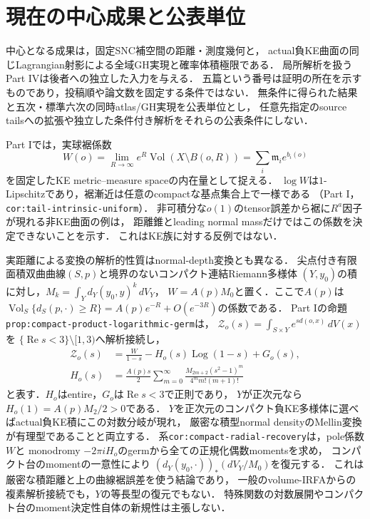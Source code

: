 \documentclass[a4paper,11pt]{ltjsarticle}
\numberwithin{equation}{section}
\theoremstyle{plain}
\theoremstyle{definition}
\theoremstyle{remark}
\newcommand{\Vol}{\operatorname{Vol}}
\begin{document}
\section{現在の中心成果と公表単位}

中心となる成果は，固定SNC補空間の距離・測度幾何と，
actual負KE曲面の同じLagrangian射影による全域GH実現と確率体積極限である．
局所解析を扱うPart IVは後者への独立した入力を与える．
五篇という番号は証明の所在を示すものであり，投稿順や論文数を固定する条件ではない．
無条件に得られた結果と五次・標準六次の同時atlas/GH実現を公表単位とし，
任意先指定のsource tailsへの拡張や独立した条件付き解析をそれらの公表条件にしない．

Part Iでは，実球裾係数
\[
 W(o)=\lim_{R\to\infty}e^R\Vol(X\setminus B(o,R))
     =\sum_i\mathfrak m_i e^{b_i(o)}
\]
を固定したKE metric--measure spaceの内在量として捉える．
$\log W$は$1$-Lipschitzであり，裾漸近は任意のcompactな基点集合上で一様である
（Part I，\texttt{cor:tail-intrinsic-uniform}）．
非可積分な$o(1)$のtensor誤差から裾に$R^a$因子が現れる非KE曲面の例は，
距離錐とleading normal massだけではこの係数を決定できないことを示す．
これはKE族に対する反例ではない．

実距離による変換の解析的性質はnormal-depth変換とも異なる．
尖点付き有限面積双曲曲線\((S,p)\)と境界のないコンパクト連結Riemann多様体
\((Y,y_0)\)の積に対し，\(M_k=\int_Yd_Y(y_0,y)^k\,dV_Y\)，
\(W=A(p)M_0\)と置く．ここで\(A(p)\)は
\(\Vol_S\{d_S(p,\cdot)\ge R\}=A(p)e^{-R}+O(e^{-3R})\)の係数である．
Part Iの命題\texttt{prop:compact-product-logarithmic-germ}は，
\(\mathcal Z_o(s)=\int_{S\times Y}e^{s d(o,x)}\,dV(x)\)を
\(\{\operatorname{Re}s<3\}\setminus[1,3)\)へ解析接続し，
\begin{align}
 \mathcal Z_o(s)&=\frac{W}{1-s}-H_o(s)\operatorname{Log}(1-s)+G_o(s),
 \label{eq:product-distance-log-germ}\\
 H_o(s)&=\frac{A(p)s}{2}\sum_{m=0}^{\infty}
 \frac{M_{2m+2}(s^2-1)^m}{4^m m!(m+1)!}
 \label{eq:product-distance-log-coefficient}
\end{align}
と表す．\(H_o\)はentire，\(G_o\)は\(\operatorname{Re}s<3\)で正則であり，
\(Y\)が正次元なら\(H_o(1)=A(p)M_2/2>0\)である．
\(Y\)を正次元のコンパクト負KE多様体に選べばactual負KE積にこの対数分岐が現れ，
厳密な積型normal densityのMellin変換が有理型であることと両立する．
系\texttt{cor:compact-radial-recovery}は，pole係数\(W\)と
monodromy \(-2\pi iH_o\)のgermから全ての正規化偶数momentsを求め，
コンパクト台のmomentの一意性により
\((d_Y(y_0,\cdot))_*(dV_Y/M_0)\)を復元する．
これは厳密な積距離と上の曲線裾誤差を使う結論であり，
一般のvolume-IRFAからの複素解析接続でも，\(Y\)の等長型の復元でもない．
特殊関数の対数展開やコンパクト台のmoment決定性自体の新規性は主張しない．
\end{document}
